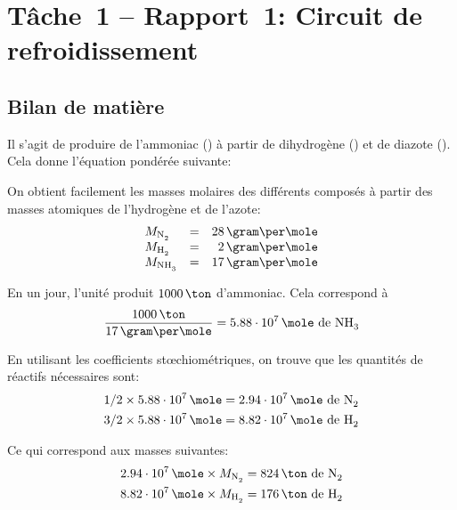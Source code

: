 \chapter{Tâche~1 -- Rapport~1: Circuit de refroidissement}

\section{Bilan de matière}
\label{sec:matiere}

Il s'agit de produire de l'ammoniac () à partir de dihydrogène ()
et de diazote ().
Cela donne l'équation pondérée suivante:
\begin{center}
\end{center}

On obtient facilement les masses molaires des différents composés à partir
des masses atomiques de l'hydrogène et de l'azote:
\begin{equation*}
    \begin{array}{lcr}
        M_{\ce{N2}} &=& 28\,\gram\per\mole\\
        M_{\ce{H2}} &=& 2\,\gram\per\mole\\
        M_{\ce{NH3}} &=& 17\,\gram\per\mole\\
    \end{array}
\end{equation*}

En un jour, l'unité produit $1000\,\ton$ d'ammoniac.
Cela correspond à
\begin{equation}
    \label{eq:mole-nh3}
    \frac{1000\,\ton}{17\,\gram\per\mole} =
    5.88\cdot10^7\,\mole\mbox{ de \ce{NH3}}
\end{equation}

En utilisant les coefficients stœchiométriques, on trouve que les quantités de
réactifs nécessaires sont:
\begin{align*}
    1/2 \times 5.88\cdot10^7\,\mole &=
    2.94\cdot10^7\,\mole \mbox{ de \ce{N2}} \\
    3/2 \times 5.88\cdot10^7\,\mole &=
    8.82\cdot10^7\,\mole \mbox{ de \ce{H2}} \\
\end{align*}

Ce qui correspond aux masses suivantes:
\begin{equation}
    \begin{aligned}
        2.94\cdot10^7\,\mole \times M_{\ce{N2}} &= 824\,\ton \mbox{ de \ce{N2}}
        \\
        8.82\cdot10^7\,\mole \times M_{\ce{H2}} &= 176\,\ton \mbox{ de \ce{H2}}
    \end{aligned}
\end{equation}

